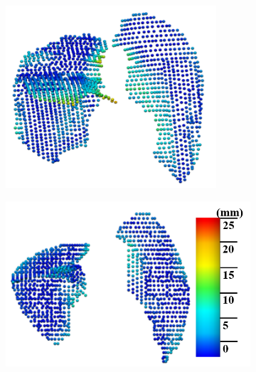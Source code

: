 {\begin{figure}[htbp]
\begin{subfigure}{.3\linewidth}
  \includegraphics[width=\linewidth,trim={{.0\wd0} {.0\wd0} {.0\wd0} {.0\wd0}},clip]{Segmentation/Image/QuanlititativeResult2.png}
  \caption{}
  \label{fig:QuanlititativeResult-b} 
\end{subfigure}
\begin{subfigure}{.38 \linewidth}%
  \includegraphics[width=\linewidth,trim={{.0\wd0} {.0\wd0} {.0\wd0} {.0\wd0}},clip]{Segmentation/Image/QuanlititativeResult3.png}

\end{subfigure}
\end{figure}}
